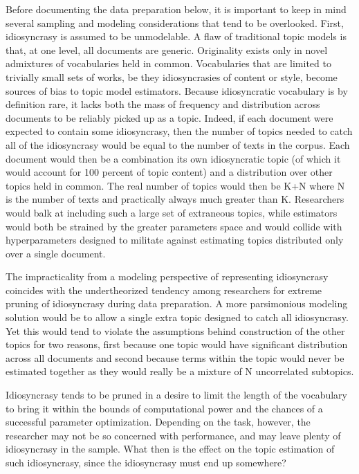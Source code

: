 \documentclass[]{book}
\theoremstyle{definition}
\theoremstyle{definition}
\theoremstyle{definition}
\theoremstyle{remark}
\begin{document}
Before documenting the data preparation below, it is important to keep
in mind several sampling and modeling considerations that tend to be
overlooked. First, idiosyncrasy is assumed to be unmodelable. A flaw of
traditional topic models is that, at one level, all documents are
generic. Originality exists only in novel admixtures of vocabularies
held in common. Vocabularies that are limited to trivially small sets of
works, be they idiosyncrasies of content or style, become sources of
bias to topic model estimators. Because idiosyncratic vocabulary is by
definition rare, it lacks both the mass of frequency and distribution
across documents to be reliably picked up as a topic. Indeed, if each
document were expected to contain some idiosyncrasy, then the number of
topics needed to catch all of the idiosyncrasy would be equal to the
number of texts in the corpus. Each document would then be a combination
its own idiosyncratic topic (of which it would account for 100 percent
of topic content) and a distribution over other topics held in common.
The real number of topics would then be K+N where N is the number of
texts and practically always much greater than K. Researchers would balk
at including such a large set of extraneous topics, while estimators
would both be strained by the greater parameters space and would collide
with hyperparameters designed to militate against estimating topics
distributed only over a single document.

The impracticality from a modeling perspective of representing
idiosyncrasy coincides with the undertheorized tendency among
researchers for extreme pruning of idiosyncrasy during data preparation.
A more parsimonious modeling solution would be to allow a single extra
topic designed to catch all idiosyncrasy. Yet this would tend to violate
the assumptions behind construction of the other topics for two reasons,
first because one topic would have significant distribution across all
documents and second because terms within the topic would never be
estimated together as they would really be a mixture of N uncorrelated
subtopics.

Idiosyncrasy tends to be pruned in a desire to limit the length of the
vocabulary to bring it within the bounds of computational power and the
chances of a successful parameter optimization. Depending on the task,
however, the researcher may not be so concerned with performance, and
may leave plenty of idiosyncrasy in the sample. What then is the effect
on the topic estimation of such idiosyncrasy, since the idiosyncrasy
must end up somewhere?
\end{document}
